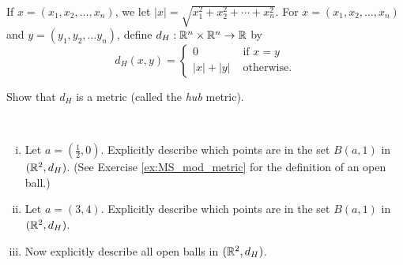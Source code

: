 {\begin{comment}
\ea

\end{comment}

\item \label{ex:MS_hub} If $x = (x_1, x_2, \ldots, x_n)$, we let $|x| = \sqrt{x_1^2+x_2^2+ \cdots + x_n^2}$. For $x = (x_1, x_2, \ldots, x_n)$ and $y = (y_1, y_2, \ldots y_n)$, define $d_H: \mathbb{R}^n \times \mathbb{R}^n \to \mathbb{R}$ by 
\[d_H(x,y) = \begin{cases} 0 &\text{ if } x=y \\ |x|+|y| &\text{ otherwise}. \end{cases}\]

\ba
\item Show that $d_H$ is a metric (called the \emph{hub} metric). 

\item ~
	\begin{enumerate}[i.]
	\item  Let $a = \left(\frac{1}{2}, 0\right)$. Explicitly describe which points are in the set $B(a,1)$ in $(\mathbb{R}^2, d_H)$. (See Exercise \ref{ex:MS_mod_metric} for the definition of an open ball.)

	\item Let $a = (3,4)$. Explicitly describe which points are in the set $B(a,1)$ in $(\mathbb{R}^2, d_H)$. 

	\item Now explicitly describe all open balls in $(\mathbb{R}^2, d_H)$. 
		
	\end{enumerate}

\ea

\begin{comment}

\ExerciseSolution

\ba
\item Let $x$ and $y$ be in $\R^n$. 
\begin{itemize}
\item Note that $d_H(x,y) \geq 0$ by definition. 
\item If $x=y$, then $d_H(x,y) = 0 = d_H(y,x)$. If $x \neq y$, then 
\[d_H(x,y) = |x|+|y| = |y|+|x| = d_H(y,x).\]
\item Next we demonstrate that $d_H(x,y) = 0$ if and only if $x=y$. First, suppose $x=y$. Then $d_H(x,y) = 0$ by definition. Now suppose that $d_H(x,y) = 0$. This means that $|x|+|y| = 0$. Since $|x| \geq 0$ and $|y| \geq 0$, it follows that $|x| = |y| = 0$. If $x = (x_1,x_2, \ldots, x_n)$, then $0 = |x| = \sqrt{x_1^2+x_2^2 + \cdots + x_n^2}$ implies that $x_i = 0$ for each $i$ and so $x = 0$. For the same reason, $y = 0$. So if $d_H(x,y) = 0$, then $x = y = 0$. 
\item To verify the triangle inequality, let $z$ be in $\R^2$. We know that $|y| \geq 0$, so 
\[d_H(x,z) = |x| + |z| \leq |x| + 2|y| + |z| = (|x|+|y|) + (|y|+|z|) = d_H(x,y) + d_H(y,z).\]
\end{itemize}


\end{comment}}
